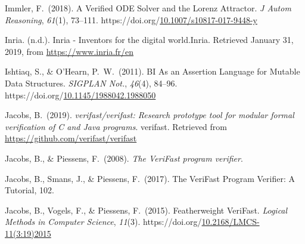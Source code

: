 \documentclass[12pt,twoside]{article}
\begin{document}
{\begin{thebibliography}{222}
\mdbibitemlabel{[Immler, 2018]}Immler, F.~(2018). A Verified ODE Solver and the Lorenz Attractor. \emph{J Autom Reasoning}, \emph{61}(1), 73–111. https://doi.org/\href{https://dx.doi.org/10.1007/s10817-017-9448-y}{10.1007/s10817-017-9448-y}\label{immler_verified_2018}%

\mdbibitemlabel{[Inria, n.d.]}Inria. (n.d.). Inria - Inventors for the digital world.Inria. Retrieved January 31, 2019, from \href{https://www.inria.fr/en}{{\ttfamily https://\hspace{0pt}www.\hspace{0pt}inria.\hspace{0pt}fr/\hspace{0pt}en}}\label{inria_inria_nodate}%

Ishtiaq, S., \& O’Hearn, P.~W.~(2011). BI As an Assertion Language for Mutable Data Structures. \emph{SIGPLAN Not.}, \emph{46}(4), 84–96. https://doi.org/\href{https://dx.doi.org/10.1145/1988042.1988050}{10.1145/1988042.1988050}\label{ishtiaq_bi_2011}%

\mdbibitemlabel{[Jacobs, 2019]}Jacobs, B.~(2019). \emph{verifast/verifast: Research prototype tool for modular formal verification of C and Java programs}. verifast. Retrieved from \href{https://github.com/verifast/verifast}{{\ttfamily https://\hspace{0pt}github.\hspace{0pt}com/\hspace{0pt}verifast/\hspace{0pt}verifast}}\label{jacobs_verifast/verifast:_2019}%

Jacobs, B., \& Piessens, F.~(2008). \emph{The VeriFast program verifier}.\label{jacobs_verifast_2008}%

Jacobs, B., Smans, J., \& Piessens, F.~(2017). The VeriFast Program Veriﬁer: A Tutorial, 102.\label{jacobs_verifast_2017}%

Jacobs, B., Vogels, F., \& Piessens, F.~(2015). Featherweight VeriFast. \emph{Logical Methods in Computer Science}, \emph{11}(3). https://doi.org/\href{https://dx.doi.org/10.2168/LMCS-11\%25283:19\%25292015}{10.2168/LMCS-11(3:19)2015}\label{jacobs_featherweight_2015}%


\end{thebibliography}}
\end{document}
